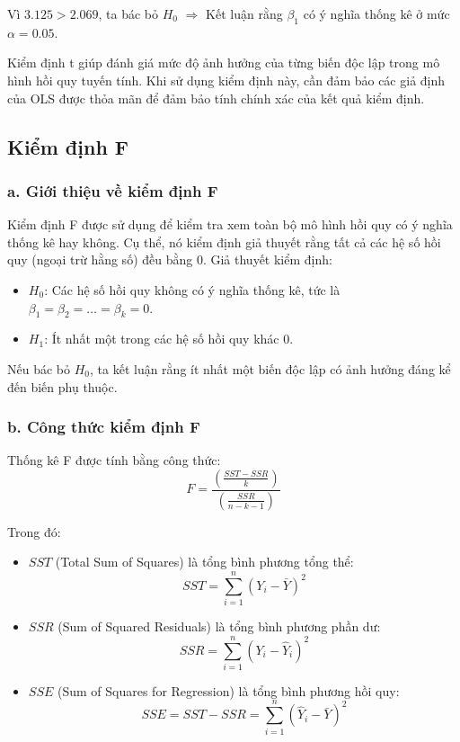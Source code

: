 Vì $3.125 > 2.069$, ta bác bỏ $H_0$ $\Rightarrow$ Kết luận rằng $\beta_1$ có ý nghĩa thống kê ở mức $\alpha = 0.05$.

Kiểm định t giúp đánh giá mức độ ảnh hưởng của từng biến độc lập trong mô hình hồi quy tuyến tính. Khi sử dụng kiểm định này, cần đảm bảo các giả định của OLS được thỏa mãn để đảm bảo tính chính xác của kết quả kiểm định.

\subsection{Kiểm định F}
\subsubsection{a. Giới thiệu về kiểm định F}
Kiểm định F được sử dụng để kiểm tra xem toàn bộ mô hình hồi quy có ý nghĩa thống kê hay không. Cụ thể, nó kiểm định giả thuyết rằng tất cả các hệ số hồi quy (ngoại trừ hằng số) đều bằng 0.
\newline
Giả thuyết kiểm định:
\begin{itemize}
    \item \( H_0 \): Các hệ số hồi quy không có ý nghĩa thống kê, tức là \( \beta_1 = \beta_2 = \dots = \beta_k = 0 \).
    \item \( H_1 \): Ít nhất một trong các hệ số hồi quy khác 0.
\end{itemize}

Nếu bác bỏ \( H_0 \), ta kết luận rằng ít nhất một biến độc lập có ảnh hưởng đáng kể đến biến phụ thuộc.

\subsubsection{b. Công thức kiểm định F}
Thống kê F được tính bằng công thức:
\begin{equation}
F = \frac{\left( \frac{SST - SSR}{k} \right)}{\left( \frac{SSR}{n - k - 1} \right)}
\end{equation}

Trong đó:
\begin{itemize}
    \item \( SST \) (Total Sum of Squares) là tổng bình phương tổng thể:
    \begin{equation}
    SST = \sum_{i=1}^{n} (Y_i - \bar{Y})^2
    \end{equation}
    \item \( SSR \) (Sum of Squared Residuals) là tổng bình phương phần dư:
    \begin{equation}
    SSR = \sum_{i=1}^{n} (Y_i - \hat{Y}_i)^2
    \end{equation}
    \item \( SSE \) (Sum of Squares for Regression) là tổng bình phương hồi quy:
    \begin{equation}
    SSE = SST - SSR = \sum_{i=1}^{n} (\hat{Y}_i - \bar{Y})^2
    \end{equation}
\end{itemize}

